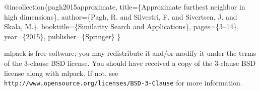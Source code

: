 \begin{DoxyCode}
@incollection\{pagh2015approximate,
  title=\{Approximate furthest neighbor in high dimensions\},
  author=\{Pagh, R. and Silvestri, F. and Sivertsen, J. and Skala, M.\},
  booktitle=\{Similarity Search and Applications\},
  pages=\{3--14\},
  year=\{2015\},
  publisher=\{Springer\}
\}
\end{DoxyCode}


mlpack is free software; you may redistribute it and/or modify it under the terms of the 3-\/clause B\+SD license. You should have received a copy of the 3-\/clause B\+SD license along with mlpack. If not, see {\tt http\+://www.\+opensource.\+org/licenses/\+B\+S\+D-\/3-\/\+Clause} for more information. 